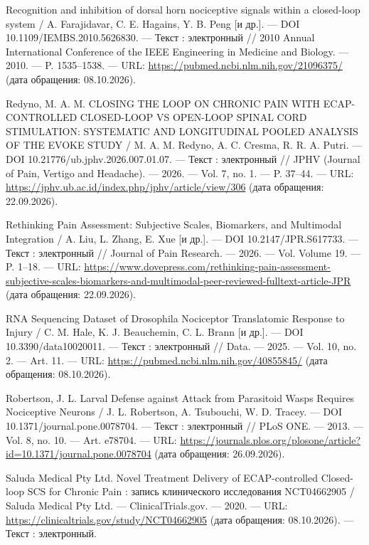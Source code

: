 \begin{list}{}{\setlength{\leftmargin}{10mm}\setlength{\labelwidth}{8mm}\setlength{\labelsep}{2mm}\setlength{\itemsep}{0pt}\setlength{\parsep}{0pt}\setlength{\topsep}{0pt}}
\item[240.] Recognition and inhibition of dorsal horn nociceptive signals within a closed-loop system / A. Farajidavar, C. E. Hagains, Y. B. Peng [и др.]. — DOI 10.1109/IEMBS.2010.5626830. — Текст : электронный // 2010 Annual International Conference of the IEEE Engineering in Medicine and Biology. — 2010. — P. 1535–1538. — URL: \url{https://pubmed.ncbi.nlm.nih.gov/21096375/} (дата обращения: 08.10.2026).
\item[241.] Redyno, M. A. M. CLOSING THE LOOP ON CHRONIC PAIN WITH ECAP-CONTROLLED CLOSED-LOOP VS OPEN-LOOP SPINAL CORD STIMULATION: SYSTEMATIC AND LONGITUDINAL POOLED ANALYSIS OF THE EVOKE STUDY / M. A. M. Redyno, A. C. Cresma, R. R. A. Putri. — DOI 10.21776/ub.jphv.2026.007.01.07. — Текст : электронный // JPHV (Journal of Pain, Vertigo and Headache). — 2026. — Vol. 7, no. 1. — P. 37–44. — URL: \url{https://jphv.ub.ac.id/index.php/jphv/article/view/306} (дата обращения: 22.09.2026).
\item[242.] Rethinking Pain Assessment: Subjective Scales, Biomarkers, and Multimodal Integration / A. Liu, L. Zhang, E. Xue [и др.]. — DOI 10.2147/JPR.S617733. — Текст : электронный // Journal of Pain Research. — 2026. — Vol. Volume 19. — P. 1–18. — URL: \url{https://www.dovepress.com/rethinking-pain-assessment-subjective-scales-biomarkers-and-multimodal-peer-reviewed-fulltext-article-JPR} (дата обращения: 22.09.2026).
\item[243.] RNA Sequencing Dataset of Drosophila Nociceptor Translatomic Response to Injury / C. M. Hale, K. J. Beauchemin, C. L. Brann [и др.]. — DOI 10.3390/data10020011. — Текст : электронный // Data. — 2025. — Vol. 10, no. 2. — Art. 11. — URL: \url{https://pubmed.ncbi.nlm.nih.gov/40855845/} (дата обращения: 08.10.2026).
\item[244.] Robertson, J. L. Larval Defense against Attack from Parasitoid Wasps Requires Nociceptive Neurons / J. L. Robertson, A. Tsubouchi, W. D. Tracey. — DOI 10.1371/journal.pone.0078704. — Текст : электронный // PLoS ONE. — 2013. — Vol. 8, no. 10. — Art. e78704. — URL: \url{https://journals.plos.org/plosone/article?id=10.1371/journal.pone.0078704} (дата обращения: 26.09.2026).
\item[245.] Saluda Medical Pty Ltd. Novel Treatment Delivery of ECAP-controlled Closed-loop SCS for Chronic Pain : запись клинического исследования NCT04662905 / Saluda Medical Pty Ltd. — ClinicalTrials.gov. — 2020. — URL: \url{https://clinicaltrials.gov/study/NCT04662905} (дата обращения: 08.10.2026). — Текст : электронный.

\end{list}
